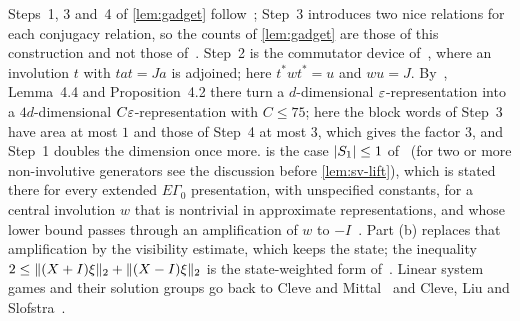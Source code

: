 \begin{remark}[Sources]\label{gadget:sources}
Steps~1, 3 and~4 of \cref{lem:gadget} follow~\cite[Prop.~4.8, Lemma~4.4, Prop.~4.2]{Slo19}; Step~3 introduces two nice relations for
each conjugacy relation, so the counts of \cref{lem:gadget} are those of this construction and not those of~\cite[Remark~4.5]{Slo19}. Step~2
is the commutator device
of~\cite[Lemma~5.2]{Slo19}, where an involution $t$ with $tat=Ja$ is adjoined; here $t^*wt^*=u$ and $wu=J$. By~\cite[Remark~4.5]{Slo19},
Lemma~4.4 and Proposition~4.2 there turn a $d$-dimensional $\varepsilon$-representation into a $4d$-dimensional $C\varepsilon$-representation with
$C\le75$; here the block words of Step~3 have area at most $1$ and those of Step~4 at most $3$, which gives the factor $3$, and Step~1 doubles
the dimension once more.  is the case $\lvert S_1\rvert\le1$ of~\cite[Prop.~6.2]{SV18} (for two or more non-involutive generators see the discussion
before \cref{lem:sv-lift}), which is stated there for every
extended $E\Gamma_0$ presentation, with unspecified constants, for a central involution $w$ that is nontrivial in approximate
representations, and whose lower bound passes through an amplification of $w$ to $-I$~\cite[Prop.~2.7]{SV18}. Part (b) replaces that
amplification by the visibility estimate, which keeps the state; the inequality $2\le\lVert (X+I)\xi\rVert_2+\lVert (X-I)\xi\rVert_2$ is the state-weighted form
of~\cite[Lemma~6.3]{SV18}. Linear system games and their solution groups go back to Cleve and Mittal~\cite{CM14} and Cleve, Liu and
Slofstra~\cite{CLS17}.
\end{remark}
